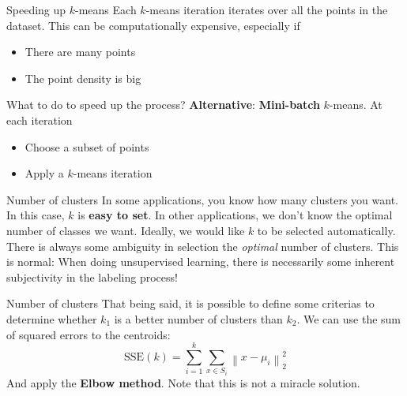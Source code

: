 \documentclass{beamer}
\newcommand{\norm}[1]{\left\lVert#1\right\rVert}
\begin{document}
\begin{frame}
\begin{center}
\end{center}
\end{frame}

\begin{frame}{Speeding up $k$-means}
Each $k$-means iteration iterates over all the points in the dataset. This can be computationally expensive, especially if
\begin{itemize}
	\item There are many points
	\item The point density is big
\end{itemize}
What to do to speed up the process?
\pause
\vfill
\textbf{Alternative}: \textbf{Mini-batch} $k$-means. At each iteration
\begin{itemize}
	\item Choose a subset of points
	\item Apply a $k$-means iteration 
\end{itemize}
\end{frame}

\begin{frame}{Number of clusters}
In some applications, you know how many clusters you want. In this case, $k$ is \textbf{easy to set}.
\vfill
In other applications, we don't know the optimal number of classes we want. Ideally, we would like $k$ to be selected automatically.
\vfill
There is always some ambiguity in selection the \textit{optimal} number of clusters. This is normal: When doing unsupervised learning, there is necessarily some inherent subjectivity in the labeling process!
\end{frame}

\begin{frame}{Number of clusters}
That being said, it is possible to define some criterias to determine whether $k_1$ is a better number of clusters than $k_2$. We can use the sum of squared errors to the centroids:
\begin{equation*}
\text{SSE}(k) = \sum_{i = 1}^{k} \sum_{x \in S_i} \norm{x - \mu_i}_2^2
\end{equation*}
And apply the \textbf{Elbow method}.
\vfill
\pause
Note that this is not a miracle solution.
\end{frame}
\end{document}
